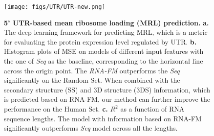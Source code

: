 \begin{figure}[!t]
\centering
\texttt{[image: figs/UTR/UTR-new.png]}
\caption{\textbf{5’ UTR-based mean ribosome loading (MRL) prediction.} \textbf{a.} The deep learning framework for predicting MRL, which is a metric for evaluating the protein expression level regulated by UTR. \textbf{b.} Histogram plots of MSE on models of different input features with the one of \textit{Seq} as the baseline, corresponding to the horizontal line across the origin point. The \textit{RNA-FM} outperforms the \textit{Seq} significantly on the Random Set. When combined with the secondary structure (SS) and 3D structure (3DS) information, which is predicted based on RNA-FM, our method can further improve the performance on the Human Set. \textbf{c.} ${R^2}$ as a function of RNA sequence lengths. 
The model with information based on RNA-FM significantly outperforms \textit{Seq} model across all the lengths.
}
\label{Fig.utr}
\end{figure}
